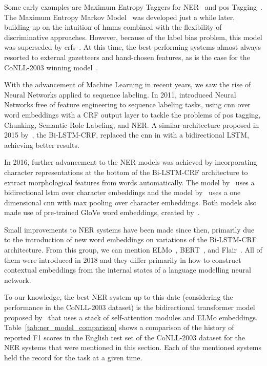 \documentclass{nle}
\begin{document}
Some early examples are Maximum Entropy Taggers for NER~\cite{Borthwick1998} and
\gls{pos} Tagging~\cite{Ratnaparkhi1998}. The Maximum Entropy Markov Model~\cite{McCallum2000} 
was developed just a while later, building up on the intuition of \gls{hmm}s combined with
the flexibility of discriminative approaches. However, because of the label bias problem,
this model was superseded by \gls{crf}s~\cite{Lafferty2001, McCallum2003}. 
At this time, the best performing systems almost always resorted to external gazetteers 
and hand-chosen features, as is the case for the {CoNLL-2003} winning model~\cite{Florian2003}.

With the advancement of Machine Learning in recent years, we saw the rise
of Neural Networks applied to sequence labeling. In 2011, \cite{Collobert2011} 
introduced Neural Networks free of feature engineering to sequence labeling tasks,
using \gls{cnn} over word embeddings with a CRF output layer to tackle 
the problems of \gls{pos} tagging, Chunking, Semantic Role Labeling, and NER. A similar architecture 
proposed in 2015 by~\cite{Huang2015}, the Bi-LSTM-CRF, replaced the \gls{cnn} in \cite{Collobert2011} 
with a bidirectional LSTM, achieving better results.

In 2016, further advancement to the NER models was achieved by incorporating character 
representations at the bottom of the Bi-LSTM-CRF architecture to extract morphological 
features from words automatically. The model by~\cite{Lample2016} uses a 
bidirectional \gls{lstm} over character embeddings and the model by~\cite{Ma2016} uses a
one dimensional \gls{cnn} with max pooling over character embeddings. Both models also 
made use of pre-trained GloVe word embeddings, created by~\cite{Pennington2014}.

Small improvements to NER systems have been made since then, primarily due to the 
introduction of new word embeddings on variations of the Bi-LSTM-CRF architecture. From
this group, we can mention ELMo~\cite{Peters2018}, BERT~\cite{Devlin2018}, and
Flair~\cite{Akbik2018}. 
All of them were introduced in 2018 and they differ primarily 
in how to construct contextual embeddings from the internal states of a language 
modelling neural network.

To our knowledge, the best NER system up to this date (considering the performance in the
{CoNLL-2003} dataset) is the bidirectional transformer model proposed by~\cite{Baevski2019} that uses
a stack of self-attention modules and ELMo embeddings. Table~\ref{tab:ner_model_comparison}
shows a comparison of the history of reported F1 scores in the English test set of the {CoNLL-2003} dataset
for the NER systems that were mentioned in this section. Each of the mentioned systems held the 
record for the task at a given time.
\end{document}
